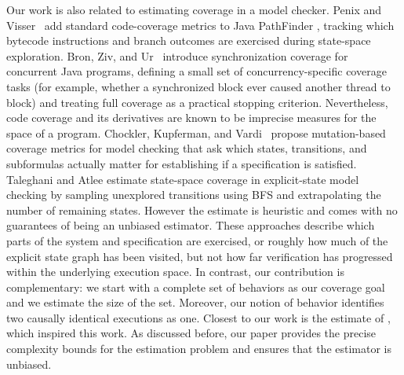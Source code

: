 \documentclass[acmsmall]{acmart}
\begin{document}
Our work is also related to estimating coverage in a model checker.
Penix and Visser~\cite{penix} add standard code-coverage metrics to Java PathFinder \cite{jpf}, tracking which bytecode instructions and branch outcomes are exercised during state-space exploration.
Bron, Ziv, and Ur~\cite{bron05} introduce synchronization coverage for concurrent Java programs, defining a small set of concurrency-specific coverage tasks (for example, whether a synchronized block ever caused another thread to block) and treating full coverage as a practical stopping criterion.
Nevertheless, code coverage and its derivatives are known to be imprecise measures for the space of a program.
Chockler, Kupferman, and Vardi~\cite{10.1007/978-3-540-39724-3_11} propose mutation-based coverage metrics for model checking that ask which states, transitions, and subformulas actually matter for establishing
if a specification is satisfied.  
Taleghani and Atlee \cite{5431751} estimate state-space coverage in explicit-state model checking by sampling unexplored transitions using BFS and extrapolating the number of remaining states. 
However the estimate is heuristic and comes with no guarantees of being an unbiased estimator. 
These approaches describe which parts of the system and specification are exercised, or roughly how much of the explicit state graph has been visited, but not how far verification has progressed within the underlying execution space. 
In contrast, our contribution is complementary: we start with a complete set of behaviors as our coverage goal and we estimate the size of the set.
Moreover, our notion of behavior identifies two causally identical executions as one.
Closest to our work is the estimate of \cite{gator}, which inspired this work.
As discussed before, our paper provides the precise complexity bounds for the estimation problem and ensures that the estimator is unbiased.
\end{document}
